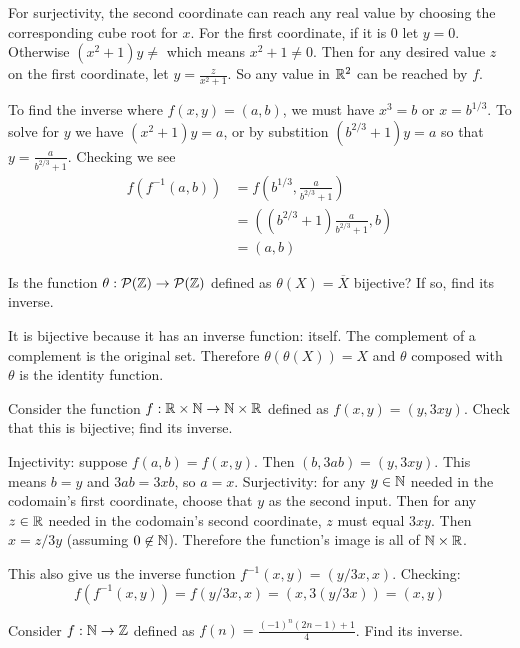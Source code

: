 \documentclass{article}
\begin{document}
For surjectivity, the second coordinate can reach any real value by choosing the corresponding cube root for $x$. For the first coordinate, if it is 0 let $y = 0$. Otherwise $(x^2 + 1)y \neq$ which means $x^2 + 1 \neq 0$. Then for any desired value $z$ on the first coordinate, let $y = \frac{z}{x^2 + 1}$. So any value in $\mathbb{R}^2$ can be reached by $f$.

To find the inverse where $f(x, y) = (a, b)$, we must have $x^3 = b$ or $x = b^{1/3}$. To solve for $y$ we have $(x^2 + 1)y = a$, or by substition $(b^{2/3} + 1)y = a$ so that $y = \frac{a}{b^{2/3} + 1}$. Checking we see
\begin{align*}
  f(f^{-1}(a, b)) & = f(b^{1/3}, \frac{a}{b^{2/3} + 1})       \\
                  & = ((b^{2/3} + 1)\frac{a}{b^{2/3} + 1}, b) \\
                  & = (a, b)
\end{align*}

\begin{problem}
Is the function $\theta: \mathcal{P}(\mathbb{Z}) \to \mathcal{P}(\mathbb{Z})$ defined as $\theta(X) = \overline{X}$ bijective? If so, find its inverse.
\end{problem}

It is bijective because it has an inverse function: itself. The complement of a complement is the original set. Therefore $\theta(\theta(X)) = X$ and $\theta$ composed with $\theta$ is the identity function.

\begin{problem}
Consider the function $f: \mathbb{R} \times \mathbb{N} \to \mathbb{N} \times \mathbb{R}$ defined as $f(x, y) = (y, 3xy)$. Check that this is bijective; find its inverse.
\end{problem}

Injectivity: suppose $f(a, b) = f(x, y)$. Then $(b, 3ab) = (y, 3xy)$. This means $b = y$ and $3ab = 3xb$, so $a = x$. Surjectivity: for any $y \in \mathbb{N}$ needed in the codomain's first coordinate, choose that $y$ as the second input. Then for any $z \in \mathbb{R}$ needed in the codomain's second coordinate, $z$ must equal $3xy$. Then $x = z/3y$ (assuming $0 \not\in \mathbb{N}$). Therefore the function's image is all of $\mathbb{N} \times \mathbb{R}$.

This also give us the inverse function $f^{-1}(x, y) = (y/3x, x)$. Checking:
$$f(f^{-1}(x, y)) = f(y/3x, x) = (x, 3(y/3x)) = (x, y)$$

\begin{problem}
Consider $f: \mathbb{N} \to \mathbb{Z}$ defined as $f(n) = \frac{(-1)^n(2n - 1) + 1}{4}$. Find its inverse.
\end{problem}
\end{document}
